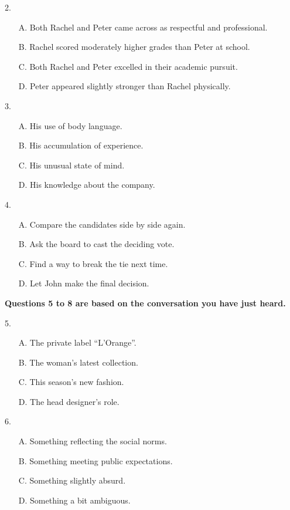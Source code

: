 \documentclass[UTF8,11pt]{ctexart}
\begin{document}
2.


\begin{itemize}[leftmargin=2em,itemsep=.2em,topsep=.4em]\item[A.] Both Rachel and Peter came across as respectful and professional.
\item[B.] Rachel scored moderately higher grades than Peter at school.
\item[C.] Both Rachel and Peter excelled in their academic pursuit.
\item[D.] Peter appeared slightly stronger than Rachel physically.
\end{itemize}

3.


\begin{itemize}[leftmargin=2em,itemsep=.2em,topsep=.4em]\item[A.] His use of body language.
\item[B.] His accumulation of experience.
\item[C.] His unusual state of mind.
\item[D.] His knowledge about the company.
\end{itemize}

4.


\begin{itemize}[leftmargin=2em,itemsep=.2em,topsep=.4em]\item[A.] Compare the candidates side by side again.
\item[B.] Ask the board to cast the deciding vote.
\item[C.] Find a way to break the tie next time.
\item[D.] Let John make the final decision.
\end{itemize}

\textbf{Questions 5 to 8 are based on the conversation you have just heard.}


5.


\begin{itemize}[leftmargin=2em,itemsep=.2em,topsep=.4em]\item[A.] The private label “L’Orange”.
\item[B.] The woman’s latest collection.
\item[C.] This season’s new fashion.
\item[D.] The head designer’s role.
\end{itemize}

6.


\begin{itemize}[leftmargin=2em,itemsep=.2em,topsep=.4em]\item[A.] Something reflecting the social norms.
\item[B.] Something meeting public expectations.
\item[C.] Something slightly absurd.
\item[D.] Something a bit ambiguous.
\end{itemize}
\end{document}
